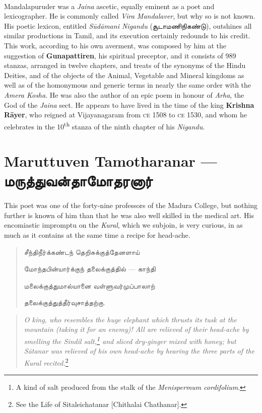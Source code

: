 \documentclass{article}
\newcommand{\TamilText}[1]{\texttamil{#1}}
\newcommand{\TamilBold}[1]{\texttamil{\textbf{#1}}}
\newcommand{\tam}[1]{\TamilText{#1}}
\newcommand{\tambold}[1]{\TamilBold{#1}}
\begin{document}
\paragraph{}
Mandalapuruder was a \emph{Jaina} ascetic, equally eminent as a poet and lexicographer. He is commonly called \emph{Vira Mandalaver}, but why so is not known. His poetic lexicon, entitled \emph{S\={u}d\={a}mani Nigandu} (\tam{சூடாமணிநிகண்டு}), outshines all similar productions in Tamil, and its execution certainly redounds to his credit. This work, according to his own averment, was composed by him at the suggestion of \textbf{Gunapattiren}, his spiritual preceptor, and it consists of 989 stanzas, arranged in twelve chapters, and treats of the synonyms of the Hindu Deities, and of the objects of the Animal, Vegetable and Mineral kingdoms as well as of the homonymous and generic terms in nearly the same order with the \emph{Amera Kosha}. He was also the author of an epic poem in honour of \emph{Arha}, the God of the \emph{Jaina} sect. He appears to have lived in the time of the king \textbf{Krishna R\={a}yer}, who reigned at Vijayanagaram from \textsc{ce} 1508 to \textsc{ce} 1530, and whom he celebrates in the 10\textsuperscript{th} stanza of the ninth chapter of his \emph{Nigandu}.

\section{Maruttuven Tamotharanar --- \tambold{மருத்துவன்தாமோதரனார்}}
\paragraph{}
This poet was one of the forty-nine professors of the Madura College, but nothing further is known of him than that he was also well skilled in the medical art. His encomiastic impromptu on the \emph{Kural}, which we subjoin, is very curious, in as much as it contains at the same time a recipe for head-ache.
\begin{quotation}\small
\tam{சீந்திநீர்க்கண்டந் தெறிசுக்குத்தேனளாய்‌}

\tam{மோந்தபின்யார்க்குந் தலைக்குத்தில்‌} --- \tam{காந்தி}

\tam{மலைக்குத்துமால்யானை வள்ளுவர்முப்பாலாற்‌}

\tam{தலைக்குத்துத்தீர்வுசாத்தற்கு}.
\end{quotation}
\begin{quotation}\small
\emph{O king, who resembles the huge elephant which thrusts its tusk at the mountain (taking it for an enemy)! All are relieved of their head-ache by smelling the Sindil salt,\footnote{A kind of salt produced from the stalk of the \emph{Menispermum cordifolium}.} and sliced dry-ginger mixed with honey; but S\={a}tanar was relieved of his own head-ache by hearing the three parts of the Kural recited.}\footnote{See the Life of Sitaleichatanar [Chithalai Chathanar].}
\end{quotation}
\end{document}
